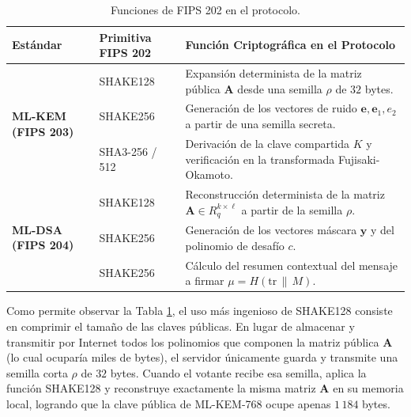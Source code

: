 \begin{table}[htbp]
	\centering
	\small
	\begin{tabular}{p{2.6cm} p{2.8cm} p{8.2cm}}
		\toprule
		\textbf{Estándar} & \textbf{Primitiva FIPS 202} & \textbf{Función Criptográfica en el Protocolo} \\
		\midrule
		\multirow{3}{2.6cm}{\textbf{ML-KEM (FIPS 203)}} & SHAKE128 & Expansión determinista de la matriz pública $\mathbf{A}$ desde una semilla $\rho$ de $32$ bytes. \\
		& SHAKE256 & Generación de los vectores de ruido $\mathbf{e}, \mathbf{e}_1, e_2$ a partir de una semilla secreta. \\
		& SHA3-256 / 512 & Derivación de la clave compartida $K$ y verificación en la transformada Fujisaki-Okamoto. \\
		\midrule
		\multirow{3}{2.6cm}{\textbf{ML-DSA (FIPS 204)}} & SHAKE128 & Reconstrucción determinista de la matriz $\mathbf{A} \in R_q^{k \times \ell}$ a partir de la semilla $\rho$. \\
		& SHAKE256 & Generación de los vectores máscara $\mathbf{y}$ y del polinomio de desafío $c$. \\
		& SHAKE256 & Cálculo del resumen contextual del mensaje a firmar $\mu = H(\text{tr} \,\|\, M)$. \\
		\bottomrule
	\end{tabular}
	\caption{Funciones de FIPS 202 en el protocolo.}
	\label{tab:fips202_roles}
	\par{}
\end{table}

Como permite observar la Tabla \ref{tab:fips202_roles}, el uso más ingenioso de SHAKE128 consiste en comprimir el tamaño de las claves públicas. En lugar de almacenar y transmitir por Internet todos los polinomios que componen la matriz pública $\mathbf{A}$ (lo cual ocuparía miles de bytes), el servidor únicamente guarda y transmite una semilla corta $\rho$ de $32$ bytes. Cuando el votante recibe esa semilla, aplica la función SHAKE128 y reconstruye exactamente la misma matriz $\mathbf{A}$ en su memoria local, logrando que la clave pública de ML-KEM-768 ocupe apenas $1\,184$ bytes.

